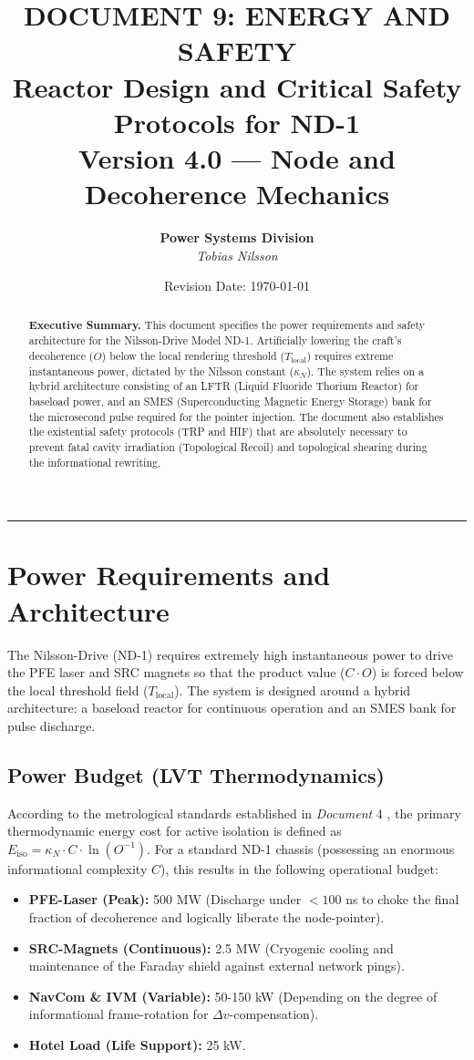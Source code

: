 \documentclass[12pt,a4paper]{article}
\title{\Huge \textbf{DOCUMENT 9: ENERGY AND SAFETY} \\[0.3em] \Large Reactor Design and Critical Safety Protocols for ND-1 \\[0.5em]
\normalsize Version 4.0 --- Node and Decoherence Mechanics}
\author{\textbf{Power Systems Division} \\ \textit{Tobias Nilsson}}
\date{Revision Date: \today}
\begin{document}
\maketitle

\vspace{-1em}
 \begin{abstract}
\noindent
\textbf{Executive Summary.} This document specifies the power requirements and safety architecture for the Nilsson-Drive Model ND-1. Artificially lowering the craft's decoherence ($O$) below the local rendering threshold ($T_{\mathrm{local}}$) requires extreme instantaneous power, dictated by the Nilsson constant ($\kappa_N$). The system relies on a hybrid architecture consisting of an LFTR (Liquid Fluoride Thorium Reactor) for baseload power, and an SMES (Superconducting Magnetic Energy Storage) bank for the microsecond pulse required for the pointer injection. The document also establishes the existential safety protocols (TRP and HIF) that are absolutely necessary to prevent fatal cavity irradiation (Topological Recoil) and topological shearing during the informational rewriting.

\end{abstract}
\vspace{1em}
\hrule
\vspace{1em}

\tableofcontents
\newpage

\section{Power Requirements and Architecture}
The Nilsson-Drive (ND-1) requires extremely high instantaneous power to drive the PFE laser and SRC magnets so that the product value ($C \cdot O$) is forced below the local threshold field ($T_{\mathrm{local}}$). The system is designed around a hybrid architecture: a baseload reactor for continuous operation and an SMES bank for pulse discharge.

\subsection{Power Budget (LVT Thermodynamics)}
According to the metrological standards established in \textit{Document} 4
, the primary thermodynamic energy cost for active isolation is defined as $E_{\mathrm{iso}} = \kappa_N \cdot C \cdot \ln(O^{-1})$. For a standard ND-1 chassis (possessing an enormous informational complexity $C$), this results in the following operational budget:
\begin{itemize}
    \item \textbf{PFE-Laser (Peak):} 500 MW (Discharge under $< 100$ ns to choke the final fraction of decoherence and logically liberate the node-pointer).
    \item \textbf{SRC-Magnets (Continuous):} 2.5 MW (Cryogenic cooling and maintenance of the Faraday shield against external network pings).
    \item \textbf{NavCom \& IVM (Variable):} 50-150 kW (Depending on the degree of informational frame-rotation for $\Delta v$-compensation).
    \item \textbf{Hotel Load (Life Support):} 25 kW.
\end{itemize}
\end{document}

